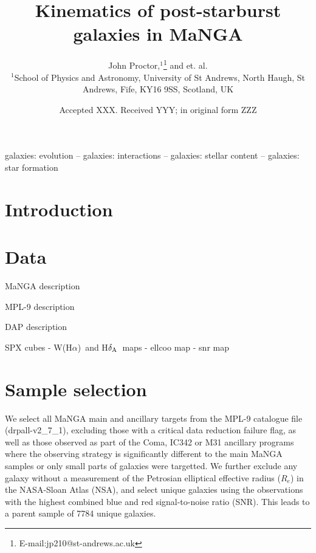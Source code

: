 \documentclass[fleqn,usenatbib]{mnras}
\title[Kinematics of post-starbursts]{Kinematics of post-starburst galaxies in MaNGA}
\author[J. Proctor et al.]{
John Proctor,$^{1}$\thanks{E-mail:jp210@st-andrews.ac.uk}
and et. al.
\\
$^{1}$School of Physics and Astronomy, University of St Andrews, North Haugh, St Andrews, Fife, KY16 9SS, Scotland, UK
}
\date{Accepted XXX. Received YYY; in original form ZZZ}
\newcommand{\hda}{H$\delta_{\rm A}$}
\newcommand{\Wha}{W(H$\alpha$)}
\newcommand{\Reff}{$R_e$}
\begin{document}
\label{firstpage}
\pagerange{\pageref{firstpage}--\pageref{lastpage}}
\maketitle

\begin{abstract}

\end{abstract}

\begin{keywords}
galaxies: evolution -- galaxies: interactions -- galaxies: stellar content -- galaxies: star formation
\end{keywords}



\section{Introduction}
\label{sec:intro}

\section{Data}
\label{sec:data}
MaNGA description

MPL-9 description

DAP description 

SPX cubes - \Wha\ and \hda\ maps - ellcoo map - snr map 

\section{Sample selection}
\label{sec:sample}

We select all MaNGA main and ancillary targets from the MPL-9 catalogue file (drpall-v2\_7\_1), excluding those with a critical data reduction failure flag, as well as those observed as part of the Coma, IC342 or M31 ancillary programs where the observing strategy is significantly different to the main MaNGA samples or only small parts of galaxies were targetted. We further exclude any galaxy without a measurement of the Petrosian elliptical effective radius (\Reff) in the NASA-Sloan Atlas (NSA), and select unique galaxies using the observations with the highest combined blue and red signal-to-noise ratio (SNR). This leads to a parent sample of 7784 unique galaxies. 
\end{document}
